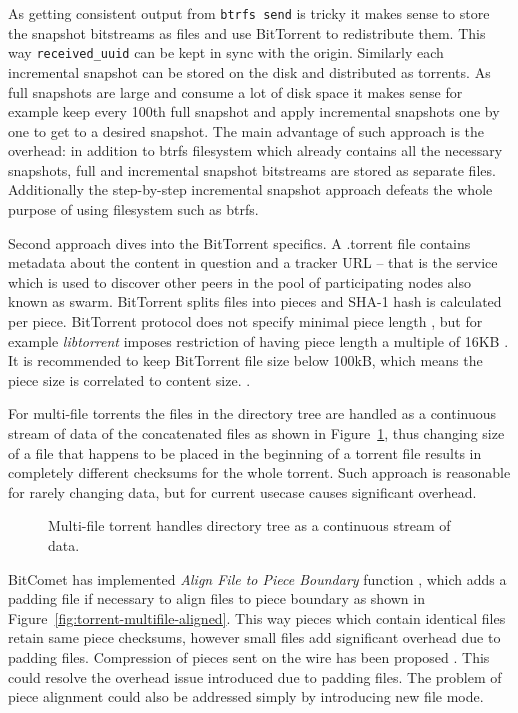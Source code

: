 \documentclass[a4paper,11pt]{kth-mag}
\begin{document}
As getting consistent output from \lstinline!btrfs send!
is tricky it makes sense to store the snapshot
bitstreams as files and use BitTorrent to redistribute them.
This way \lstinline!received_uuid! can be kept in sync with the origin.
Similarly each incremental snapshot can be stored on the
disk and distributed as torrents.
As full snapshots are large and consume a lot
of disk space it makes sense for example
keep every 100th full snapshot and apply
incremental snapshots one by one to get
to a desired snapshot.
The main advantage of such approach is the overhead:
in addition to \acrshort{btrfs} filesystem which already
contains all the necessary snapshots,
full and incremental snapshot bitstreams
are stored as separate files.
Additionally the step-by-step incremental
snapshot approach defeats the whole
purpose of using filesystem such as \acrshort{btrfs}.

Second approach dives into the BitTorrent specifics.
A .torrent file contains metadata about the content in question and a
tracker URL -- that is the service which is used to discover other peers in the
pool of participating nodes also known as swarm.
BitTorrent splits files into pieces and SHA-1 hash is calculated per piece.
BitTorrent protocol does not specify minimal piece length
\cite{bep0003},
but for example \emph{libtorrent} imposes restriction of having piece length
a multiple of 16KB
\cite{libtorrent-create-torrents}.
It is recommended to keep BitTorrent file size below 100kB,
which means the piece size is correlated to content size.
\cite{torrent-piece-size}.

For multi-file torrents the files in the directory tree are handled
as a continuous stream of data of the concatenated files
as shown in Figure~\ref{fig:torrent-multifile},
thus changing size of a file that happens to be placed in the beginning of a torrent
file results in completely different checksums for the whole torrent.
Such approach is reasonable for rarely changing data, but for current usecase
causes significant overhead.

\begin{figure}[!htb]
\centering
\scalebox{0.35}{}
\caption{Multi-file torrent handles directory tree as a continuous stream of data.}
\label{fig:torrent-multifile}
\end{figure}

BitComet has implemented \emph{Align File to Piece Boundary} function
\cite{bitcomet-align-to-piece},
which adds a padding file if necessary to align files to piece boundary
as shown in Figure~\ref{fig:torrent-multifile-aligned}.
This way pieces which contain identical files retain same piece checksums,
however small files add significant overhead due to padding files.
Compression of pieces sent on the wire has been proposed
\cite{bittorrent-wishlist}.
This could resolve the overhead issue introduced due to padding files.
The problem of piece alignment could also be addressed
simply by introducing new file mode.
\end{document}
